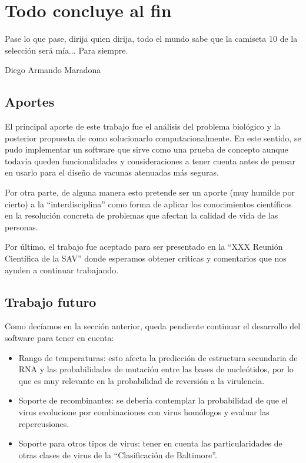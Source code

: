 \chapter{Todo concluye al fin}
\epigraph{Pase lo que pase, dirija quien dirija, todo el mundo sabe que la
camiseta 10 de la selecci\'on ser\'a m\'ia... Para siempre.}%
{Diego Armando Maradona}

\section{Aportes}

El principal aporte de este trabajo fue el an\'alisis del problema biol\'ogico y
la posterior propuesta de como solucionarlo computacionalmente. En este sentido,
se pudo implementar un software que sirve como una prueba de concepto aunque
todav\'ia queden funcionalidades y consideraciones a tener cuenta antes de
pensar en usarlo para el dise\~no de vacunas atenuadas m\'as seguras.

Por otra parte, de alguna manera esto pretende ser un aporte (muy humilde por
cierto) a la ``interdisciplina'' como forma de aplicar los conocimientos
cient\'ificos en la resoluci\'on concreta de problemas que afectan la calidad de
vida de las personas.

Por \'ultimo, el trabajo fue aceptado para ser presentado en la ``XXX Reuni\'on
Cient\'ifica de la \ac{SAV}'' donde esperamos obtener criticas y comentarios que
nos ayuden a continuar trabajando.

\section{Trabajo futuro}

Como dec\'iamos en la secci\'on anterior, queda pendiente continuar el
desarrollo del software para tener en cuenta:
\begin{itemize}
 \item Rango de temperaturas: esto afecta la predicci\'on de estructura
secundaria de \ac{RNA} y las probabilidades de mutaci\'on entre las bases de
nucle\'otidos, por lo que es muy relevante en la probabilidad de reversi\'on a
la virulencia.
 \item Soporte de recombinantes: se deber\'ia contemplar la probabilidad de que
el virus evolucione por combinaciones con virus hom\'ologos y evaluar las
repercusiones.
 \item Soporte para otros tipos de virus: tener en cuenta las particularidades
de otras clases de virus de la ``Clasificaci\'on de Baltimore''.
\end{itemize}

